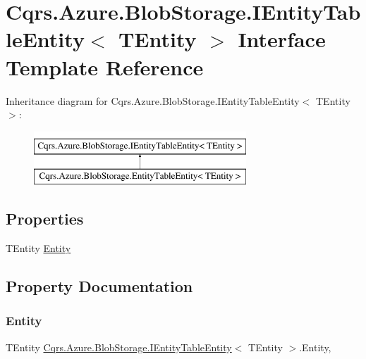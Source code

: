 \hypertarget{interfaceCqrs_1_1Azure_1_1BlobStorage_1_1IEntityTableEntity}{}\section{Cqrs.\+Azure.\+Blob\+Storage.\+I\+Entity\+Table\+Entity$<$ T\+Entity $>$ Interface Template Reference}
\label{interfaceCqrs_1_1Azure_1_1BlobStorage_1_1IEntityTableEntity}
Inheritance diagram for Cqrs.\+Azure.\+Blob\+Storage.\+I\+Entity\+Table\+Entity$<$ T\+Entity $>$\+:\begin{figure}[H]
\begin{center}
\leavevmode
\includegraphics[height=2.000000cm]{interfaceCqrs_1_1Azure_1_1BlobStorage_1_1IEntityTableEntity}
\end{center}
\end{figure}
\subsection*{Properties}
\begin{DoxyCompactItemize}
\item 
T\+Entity \hyperlink{interfaceCqrs_1_1Azure_1_1BlobStorage_1_1IEntityTableEntity_a06bd38e994772fa43bf8f456c1b3d6e2_a06bd38e994772fa43bf8f456c1b3d6e2}{Entity}
\end{DoxyCompactItemize}


\subsection{Property Documentation}
\mbox{\label{interfaceCqrs_1_1Azure_1_1BlobStorage_1_1IEntityTableEntity_a06bd38e994772fa43bf8f456c1b3d6e2_a06bd38e994772fa43bf8f456c1b3d6e2}} 
\subsubsection{\texorpdfstring{Entity}{Entity}}
{\footnotesize\ttfamily T\+Entity \hyperlink{interfaceCqrs_1_1Azure_1_1BlobStorage_1_1IEntityTableEntity}{Cqrs.\+Azure.\+Blob\+Storage.\+I\+Entity\+Table\+Entity}$<$ T\+Entity $>$.Entity\hspace{0.3cm}{\ttfamily [get]}, {\ttfamily [set]}}

